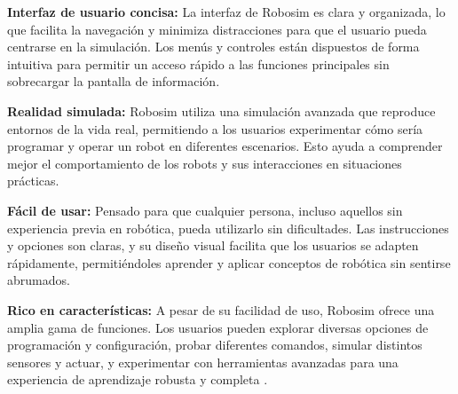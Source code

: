\textbf{Interfaz de usuario concisa:} La interfaz de Robosim es clara y organizada, lo que facilita la navegación y minimiza distracciones para que el usuario pueda centrarse en la simulación. Los menús y controles están dispuestos de forma intuitiva para permitir un acceso rápido a las funciones principales sin sobrecargar la pantalla de información.

\textbf{Realidad simulada:} Robosim utiliza una simulación avanzada que reproduce entornos de la vida real, permitiendo a los usuarios experimentar cómo sería programar y operar un robot en diferentes escenarios. Esto ayuda a comprender mejor el comportamiento de los robots y sus interacciones en situaciones prácticas.

\textbf{Fácil de usar:} Pensado para que cualquier persona, incluso aquellos sin experiencia previa en robótica, pueda utilizarlo sin dificultades. Las instrucciones y opciones son claras, y su diseño visual facilita que los usuarios se adapten rápidamente, permitiéndoles aprender y aplicar conceptos de robótica sin sentirse abrumados.

\textbf{Rico en características:} A pesar de su facilidad de uso, Robosim ofrece una amplia gama de funciones. Los usuarios pueden explorar diversas opciones de programación y configuración, probar diferentes comandos, simular distintos sensores y actuar, y experimentar con herramientas avanzadas para una experiencia de aprendizaje robusta y completa \cite{zmrobo2}.
